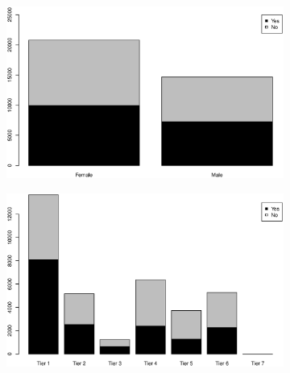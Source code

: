\documentclass[12pt,english]{report}
\begin{document}
\begin{figure}[p] 
\begin{subfigure}{0.48\textwidth}
\includegraphics[width=\linewidth]{pic/enroll_gender}
\caption{} \label{enroll:a}
\end{subfigure}\hspace*{\fill}
\begin{subfigure}{0.48\textwidth }
\includegraphics[width=\linewidth]{pic/enroll_tier}
\caption{} \label{enroll:b}
\end{subfigure}


\end{figure}
\end{document}
